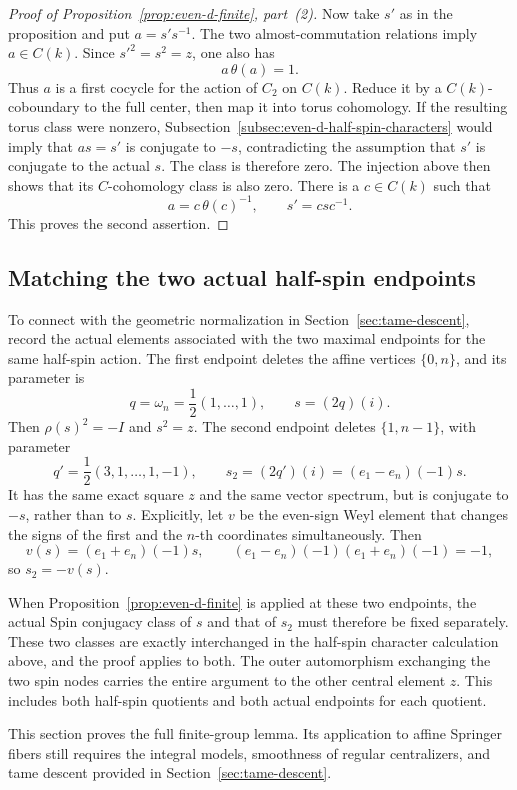 \documentclass[11pt,a4paper]{article}
\theoremstyle{definition}
\theoremstyle{remark}
\begin{document}
\begin{proof}[Proof of Proposition~\ref{prop:even-d-finite}, part~(2)]
Now take \(s'\) as in the proposition and put \(a=s's^{-1}\).
The two almost-commutation relations imply \(a\in C(k)\). Since
\(s'^2=s^2=z\), one also has
\[
a\,\theta(a)=1.
\]
Thus \(a\) is a first cocycle for the action of \(C_2\) on \(C(k)\).
Reduce it by a \(C(k)\)-coboundary to the full center, then map it into
torus cohomology. If the resulting torus class were nonzero,
Subsection~\ref{subsec:even-d-half-spin-characters} would imply that
\(as=s'\) is conjugate to \(-s\), contradicting the assumption that
\(s'\) is conjugate to the actual \(s\). The class is therefore zero.
The injection above then shows that its \(C\)-cohomology class is also
zero. There is a \(c\in C(k)\) such that
\[
a=c\,\theta(c)^{-1},
\qquad
s'=csc^{-1}.
\]
This proves the second assertion.
\end{proof}

\subsection{Matching the two actual half-spin endpoints}

To connect with the geometric normalization in
Section~\ref{sec:tame-descent}, record the actual elements associated
with the two maximal endpoints for the same half-spin action. The
first endpoint deletes the affine vertices \(\{0,n\}\), and its
parameter is
\[
q=\omega_n=\frac12(1,\ldots,1),
\qquad
s=(2q)(i).
\]
Then \(\rho(s)^2=-I\) and \(s^2=z\). The second endpoint deletes
\(\{1,n-1\}\), with parameter
\[
q'=\frac12(3,1,\ldots,1,-1),
\qquad
s_2=(2q')(i)=(e_1-e_n)(-1)s.
\]
It has the same exact square \(z\) and the same vector spectrum, but
is conjugate to \(-s\), rather than to \(s\). Explicitly, let \(v\)
be the even-sign Weyl element that changes the signs of the first and
the \(n\)-th coordinates simultaneously. Then
\[
v(s)=(e_1+e_n)(-1)s,
\qquad
(e_1-e_n)(-1)(e_1+e_n)(-1)=-1,
\]
so \(s_2=-v(s)\).

When Proposition~\ref{prop:even-d-finite} is applied at these two
endpoints, the actual Spin conjugacy class of \(s\) and that of \(s_2\)
must therefore be fixed separately. These two classes are exactly
interchanged in the half-spin character calculation above, and the
proof applies to both. The outer automorphism exchanging the two spin
nodes carries the entire argument to the other central element \(z\).
This includes both half-spin quotients and both actual endpoints for
each quotient.

This section proves the full finite-group lemma. Its application to
affine Springer fibers still requires the integral models, smoothness
of regular centralizers, and tame descent provided in
Section~\ref{sec:tame-descent}.
\end{document}
